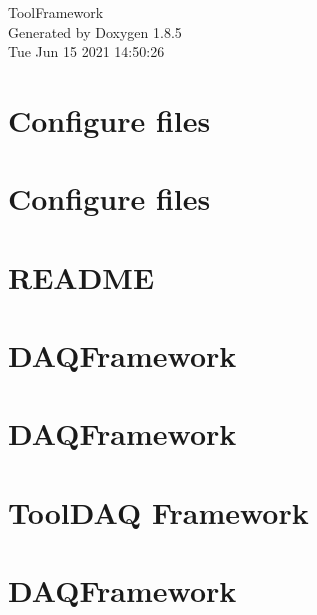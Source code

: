 \documentclass[twoside]{book}
\newcommand{\clearemptydoublepage}{%
  \newpage{\pagestyle{empty}\cleardoublepage}%
}
\begin{document}
\hypersetup{pageanchor=false}
\begin{titlepage}
\vspace*{7cm}
\begin{center}%
{\Large Tool\-Framework }\\
\vspace*{1cm}
{\large Generated by Doxygen 1.8.5}\\
\vspace*{0.5cm}
{\small Tue Jun 15 2021 14:50:26}\\
\end{center}
\end{titlepage}
\clearemptydoublepage
\tableofcontents
\clearemptydoublepage
{}
\hypersetup{pageanchor=true}

\chapter{Configure files}
\label{md_configfiles_README}
\hypertarget{md_configfiles_README}{}

\chapter{Configure files}
\label{md_configfiles_template_README}
\hypertarget{md_configfiles_template_README}{}

\chapter{R\-E\-A\-D\-M\-E}
\label{md_DataModel_README}
\hypertarget{md_DataModel_README}{}

\chapter{D\-A\-Q\-Framework}
\label{md_include_README}
\hypertarget{md_include_README}{}

\chapter{D\-A\-Q\-Framework}
\label{md_lib_README}
\hypertarget{md_lib_README}{}

\chapter{Tool\-D\-A\-Q Framework}
\label{md_README}
\hypertarget{md_README}{}

\chapter{D\-A\-Q\-Framework}
\label{md_src_Store_README}
\hypertarget{md_src_Store_README}{}

\end{document}
